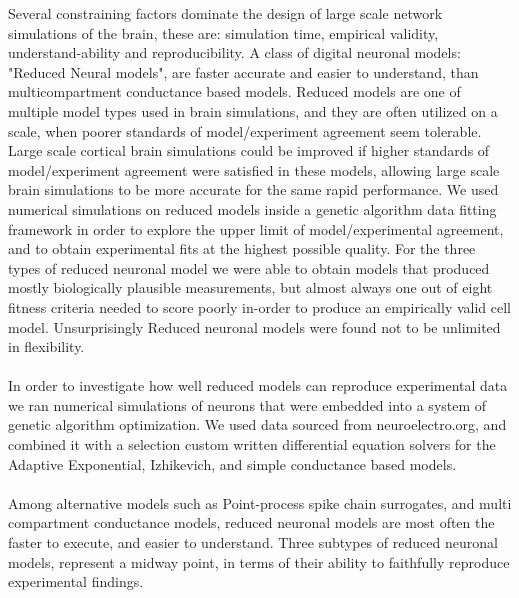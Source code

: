 
Several constraining factors dominate the design of large scale network simulations of the brain, these are: simulation time, empirical validity, understand-ability and reproducibility. A class of digital neuronal models: "Reduced Neural models", are faster accurate and easier to understand, than multicompartment conductance based models. Reduced models are one of multiple model types used in brain simulations, and they are often utilized on a scale, when poorer standards of model/experiment agreement seem tolerable. Large scale cortical brain simulations could be improved if higher standards of model/experiment agreement were satisfied in these models, allowing large scale brain simulations to be more accurate for the same rapid performance. We used numerical simulations on reduced models inside a genetic algorithm data fitting framework in order to explore the upper limit of model/experimental agreement, and to obtain experimental fits at the highest possible quality. For the three types of reduced neuronal model we were able to obtain models that produced mostly biologically plausible measurements, but almost always one out of eight fitness criteria needed to score poorly in-order to produce an empirically valid cell model. Unsurprisingly Reduced neuronal models were found not to be unlimited in flexibility.\\
\\

In order to investigate how well reduced models can reproduce experimental data we ran numerical simulations of neurons that were embedded into a system of genetic algorithm optimization. We used data sourced from neuroelectro.org, and combined it with a selection custom written differential equation solvers for the Adaptive Exponential, Izhikevich, and simple conductance based models.\\
\\
Among alternative models such as Point-process spike chain surrogates, and  multi compartment conductance models, reduced neuronal models are most often the faster to execute, and easier to understand. Three subtypes of reduced neuronal models, represent a midway point, in terms of their ability to faithfully reproduce experimental findings.




